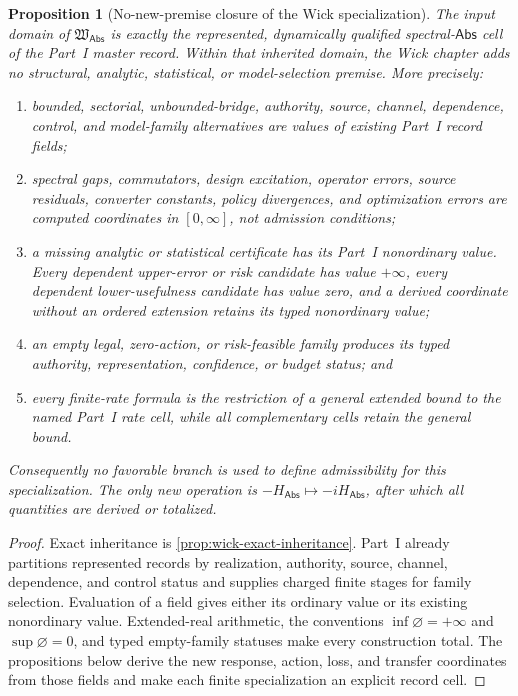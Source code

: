 \documentclass[11pt]{article}
\numberwithin{section}{part}
\theoremstyle{plain}
\newtheorem{proposition}[proposition]{Proposition}
\theoremstyle{definition}
\theoremstyle{remark}
\newcommand{\Abs}{\mathsf{Abs}}
\begin{document}
\begin{proposition}[No-new-premise closure of the Wick specialization]
\label{prop:wick-no-new-premise-closure}
The input domain of \(\mathfrak W_{\Abs}\) is exactly the represented,
dynamically qualified spectral-\(\Abs\) cell of the Part~I master record.
Within that inherited domain, the Wick chapter adds no structural, analytic,
statistical, or model-selection premise.  More precisely:
\begin{enumerate}[label=\textup{(\roman*)}]
\item bounded, sectorial, unbounded-bridge, authority, source, channel,
dependence, control, and model-family alternatives are values of existing
Part~I record fields;
\item spectral gaps, commutators, design excitation, operator errors, source
residuals, converter constants, policy divergences, and optimization errors
are computed coordinates in \([0,\infty]\), not admission conditions;
\item a missing analytic or statistical certificate has its Part~I
nonordinary value.  Every dependent upper-error or risk candidate has value
\(+\infty\), every dependent lower-usefulness candidate has value zero, and
a derived coordinate without an ordered extension retains its typed
nonordinary value;
\item an empty legal, zero-action, or risk-feasible family produces its typed
authority, representation, confidence, or budget status; and
\item every finite-rate formula is the restriction of a general extended
bound to the named Part~I rate cell, while all complementary cells retain the
general bound.
\end{enumerate}
Consequently no favorable branch is used to define admissibility for this
specialization.  The only new operation is
\(-H_{\Abs}\mapsto-iH_{\Abs}\), after which all quantities are derived or
totalized.
\end{proposition}

\begin{proof}
Exact inheritance is \cref{prop:wick-exact-inheritance}.  Part~I already
partitions represented records by realization, authority, source, channel,
dependence, and control status and supplies charged finite stages for family
selection.  Evaluation of a field gives either its ordinary value or its
existing nonordinary value.  Extended-real arithmetic, the conventions
\(\inf\varnothing=+\infty\) and \(\sup\varnothing=0\), and typed empty-family
statuses make every construction total.  The propositions below derive the
new response, action, loss, and transfer coordinates from those fields and
make each finite specialization an explicit record cell.
\end{proof}
\end{document}
